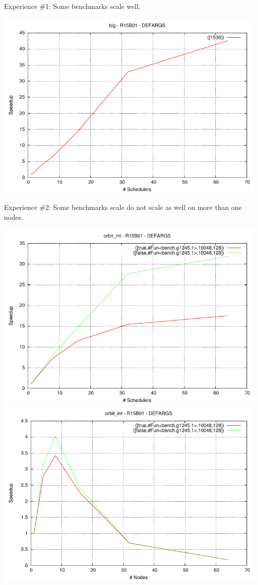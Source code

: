 \documentclass{beamer}
\begin{document}
\begin{frame}{Experience \#1: Some benchmarks scale well.}
	\begin{center}
		\includegraphics[width=0.8\linewidth]{figures/big-speedup-bulldozer.pdf}
	\end{center}
\end{frame}

\begin{frame}{Experience \#2: Some benchmarks scale do not scale as well on more than one nodes.}
    \begin{center}
        \includegraphics[width=0.45\linewidth]{figures/orbit_int_par-speedup-bulldozer.pdf}
        \includegraphics[width=0.45\linewidth]{figures/orbit_int_dist-speedup-bulldozer.pdf}
    \end{center}
\end{frame}
\end{document}
